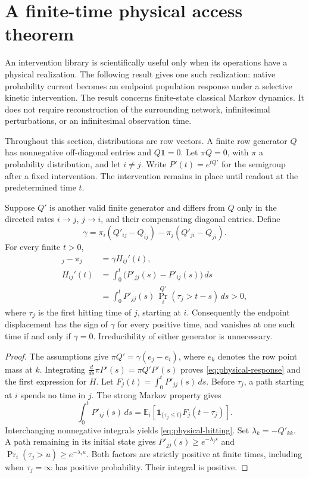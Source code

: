 \chapter{A finite-time physical access theorem}
\label{sec:physical-pulse}

An intervention library is scientifically useful only when its operations have
a physical realization.  The following result gives one such realization:
native probability current becomes an endpoint population response under a
selective kinetic intervention.  The result concerns finite-state classical
Markov dynamics.  It does not require reconstruction of the surrounding
network, infinitesimal perturbations, or an infinitesimal observation time.

Throughout this section, distributions are row vectors.  A finite row
generator $Q$ has nonnegative off-diagonal entries and $Q\mathbf 1=0$.
Let $\pi Q=0$, with $\pi$ a probability distribution, and let $i\ne j$.
Write $P'(t)=e^{tQ'}$ for the semigroup after a fixed intervention.  The
intervention remains in place until readout at the predetermined time $t$.

\begin{theorem}
\label{thm:physical-endpoint-response}
Suppose $Q'$ is another valid finite generator and differs from $Q$ only in
the directed rates $i\to j$, $j\to i$, and their compensating diagonal
entries.  Define
\[
 \gamma=\pi_i(Q'_{ij}-Q_{ij})-\pi_j(Q'_{ji}-Q_{ji}).
\]
For every finite $t>0$,
\begin{align}
 [\pi P'(t)]_j-\pi_j&=\gamma H_{ij}'(t),\label{eq:physical-response}\\
 H_{ij}'(t)&=\int_0^t\bigl(P'_{jj}(s)-P'_{ij}(s)\bigr)\,ds\nonumber\\
 &=\int_0^t P'_{jj}(s)\,
       \Pr_i^{Q'}(\tau_j>t-s)\,ds>0,\label{eq:physical-hitting}
\end{align}
where $\tau_j$ is the first hitting time of $j$, starting at $i$.
Consequently the endpoint displacement has the sign of $\gamma$ for
every positive time, and vanishes at one such time if and only if
$\gamma=0$.  Irreducibility of either generator is unnecessary.
\end{theorem}

\begin{proof}
The assumptions give $\pi Q'=\gamma(e_j-e_i)$, where $e_k$ denotes the
row point mass at $k$.  Integrating
$\frac{d}{ds}\pi P'(s)=\pi Q'P'(s)$ proves
\eqref{eq:physical-response} and the first expression for $H$.
Let $F_j(t)=\int_0^tP'_{jj}(s)\,ds$.  Before $\tau_j$, a path starting
at $i$ spends no time in $j$.  The strong Markov property gives
\[
 \int_0^tP'_{ij}(s)\,ds
 =\mathbb E_i\!\left[
       \mathbf 1_{\{\tau_j\le t\}}F_j(t-\tau_j)\right].
\]
Interchanging nonnegative integrals yields
\eqref{eq:physical-hitting}.  Set $\lambda_k=-Q'_{kk}$.  A path
remaining in its initial state gives
$P'_{jj}(s)\ge e^{-\lambda_j s}$ and
$\Pr_i(\tau_j>u)\ge e^{-\lambda_i u}$.
Both factors are strictly positive at finite times, including when
$\tau_j=\infty$ has positive probability.  Their integral is positive.
\end{proof}

